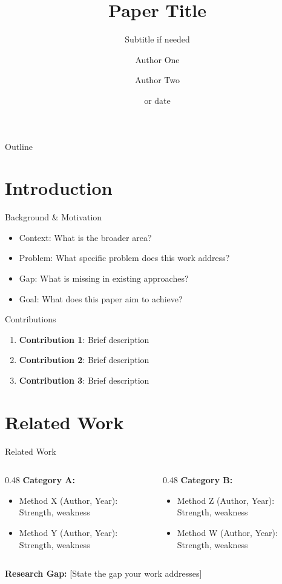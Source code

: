\documentclass[aspectratio=169,11pt]{beamer}
\title[Talk]{Paper Title}
\subtitle{Subtitle if needed}
\author{Author One \and Author Two}
\institute{University / Institution}
\date{\conference or date}
\begin{document}
\begin{frame}
\titlepage
\end{frame}

\begin{frame}{Outline}
\tableofcontents
\end{frame}

\section{Introduction}

\begin{frame}{Background \& Motivation}
\begin{itemize}
    \item Context: What is the broader area?
    \item Problem: What specific problem does this work address?
    \item Gap: What is missing in existing approaches?
    \item Goal: What does this paper aim to achieve?
\end{itemize}
\end{frame}

\begin{frame}{Contributions}
\begin{enumerate}
    \item \textbf{Contribution 1}: Brief description
    \item \textbf{Contribution 2}: Brief description
    \item \textbf{Contribution 3}: Brief description
\end{enumerate}
\end{frame}

\section{Related Work}

\begin{frame}{Related Work}
\begin{columns}[T]
\begin{column}{0.48\textwidth}
\textbf{Category A:}
\begin{itemize}
    \item Method X (Author, Year): Strength, weakness
    \item Method Y (Author, Year): Strength, weakness
\end{itemize}
\end{column}
\begin{column}{0.48\textwidth}
\textbf{Category B:}
\begin{itemize}
    \item Method Z (Author, Year): Strength, weakness
    \item Method W (Author, Year): Strength, weakness
\end{itemize}
\end{column}
\end{columns}

\vspace{1em}
\textbf{Research Gap:} [State the gap your work addresses]
\end{frame}
\end{document}
